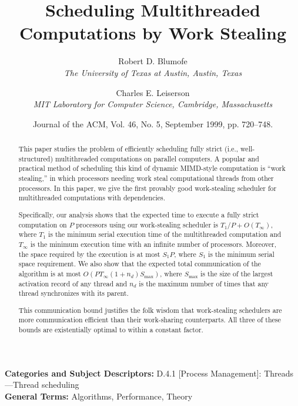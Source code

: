 \documentclass{article}
\title{Scheduling Multithreaded Computations by Work Stealing}
\author{
  Robert D. Blumofe \\
  \textit{The University of Texas at Austin, Austin, Texas}
  \and
  Charles E. Leiserson \\
  \textit{MIT Laboratory for Computer Science, Cambridge, Massachusetts}
}
\date{Journal of the ACM, Vol. 46, No. 5, September 1999, pp. 720--748.}
\begin{document}
\maketitle

\begin{abstract}
This paper studies the problem of efficiently scheduling fully strict (i.e., well-structured) multithreaded computations on parallel computers. A popular and practical method of scheduling this kind of dynamic MIMD-style computation is ``work stealing,'' in which processors needing work steal computational threads from other processors. In this paper, we give the first provably good work-stealing scheduler for multithreaded computations with dependencies.

Specifically, our analysis shows that the expected time to execute a fully strict computation on $P$ processors using our work-stealing scheduler is $T_1/P + O(T_\infty)$, where $T_1$ is the minimum serial execution time of the multithreaded computation and $T_\infty$ is the minimum execution time with an infinite number of processors. Moreover, the space required by the execution is at most $S_1 P$, where $S_1$ is the minimum serial space requirement. We also show that the expected total communication of the algorithm is at most $O(P T_\infty (1 + n_d) S_{\max})$, where $S_{\max}$ is the size of the largest activation record of any thread and $n_d$ is the maximum number of times that any thread synchronizes with its parent.

This communication bound justifies the folk wisdom that work-stealing schedulers are more communication efficient than their work-sharing counterparts. All three of these bounds are existentially optimal to within a constant factor.
\end{abstract}

\vspace{0.5em}
\noindent\textbf{Categories and Subject Descriptors:} D.4.1 [Process Management]: Threads---Thread scheduling \\
\textbf{General Terms:} Algorithms, Performance, Theory
\end{document}
